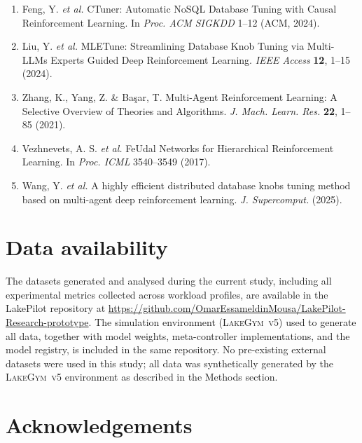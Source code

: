 \documentclass[fleqn,10pt]{wlscirep}
\newcommand{\env}{\textsc{LakeGym~v5}}
\begin{document}
\begin{enumerate}
\item Feng, Y. \textit{et al.} CTuner: Automatic NoSQL Database Tuning
  with Causal Reinforcement Learning. In \textit{Proc. ACM SIGKDD}
  1--12 (ACM, 2024).

\item Liu, Y. \textit{et al.} MLETune: Streamlining Database Knob Tuning
  via Multi-LLMs Experts Guided Deep Reinforcement Learning.
  \textit{IEEE Access} \textbf{12}, 1--15 (2024).

\item Zhang, K., Yang, Z. \& Ba\c{s}ar, T. Multi-Agent Reinforcement
  Learning: A Selective Overview of Theories and Algorithms.
  \textit{J. Mach. Learn. Res.} \textbf{22}, 1--85 (2021).

\item Vezhnevets, A. S. \textit{et al.} FeUdal Networks for Hierarchical
  Reinforcement Learning. In \textit{Proc. ICML} 3540--3549 (2017).

\item Wang, Y. \textit{et al.} A highly efficient distributed database
  knobs tuning method based on multi-agent deep reinforcement learning.
  \textit{J. Supercomput.} (2025).

\end{enumerate}

\section*{Data availability}
The datasets generated and analysed during the current study,
including all experimental metrics collected across workload profiles,
are available in the LakePilot repository at
\url{https://github.com/OmarEssameldinMousa/LakePilot-Research-prototype}.
The simulation environment (\env{}) used to generate all data,
together with model weights, meta-controller implementations, and
the model registry, is included in the same repository.
No pre-existing external datasets were used in this study; all data
was synthetically generated by the \env{} environment as described
in the Methods section.
\section*{Acknowledgements}
\end{document}
